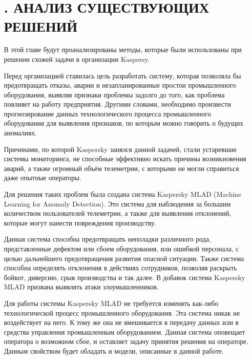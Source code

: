 \sectionbreak \section*{
  \cyrillicfont 
  \fontsize{14pt}{0pt}\selectfont
  \englishfont 
  . АНАЛИЗ СУЩЕСТВУЮЩИХ РЕШЕНИЙ
}

\titlespace

{\cyrillicfont 
\fontsize{13pt}{16.25pt}\selectfont 
\englishfont 

  \par \redline В этой главе будут проанализированы методы, которые были использованы при решении схожей задачи в организации Kaspersy. 

  \par \redline	Перед организацией ставилась цель разработать систему, которая позволяла бы предотвращать отказы, аварии и незапланированные простои промышленного оборудования, выявляя признаки проблемы задолго до того, как проблема повлияет на работу предприятия. Другими словами, необходимо произвести прогнозирование данных технологического процесса промышленного оборудования для выявления признаков, по которым можно говорить о будущих аномалиях. 

  \par \redline	Причинами, по которой Kaspersky занялся данной задачей, стали устаревшие системы мониторинга, не способные эффективно искать причины возникновения аварий, а также огромный объём телеметрии, с которыми не могли справиться даже опытные операторы. 

  \par \redline	Для решения таких проблем была создана система Kaspersky MLAD (Machine Learning for Anomaly Detection). Это система для наблюдения за большим количеством пользователей телеметрии, а также для выявления отклонений, которые могут нанести повреждения производству.   

  \par \redline Данная система способна предотвращать неполадки различного рода, представленные дефектом или сбоем оборудования, или ошибкой персонала, с целью дальнейшего предотвращения развития опасной ситуации. Также система способна определять отклонения в действиях сотрудников, позволяя раскрыть бойкот, диверсию, срыв производства и так далее. В добавок система Kaspersky MLAD призвана выявлять атаки злоумышленников. 

  \par \redline Для работы системы Kaspersky MLAD не требуется изменять как-либо технологической процесс промышленного оборудования. Эта система никак не воздействует на него. К тому же она не вмешивается в передачу данных или в средства управления промышленным оборудованием. Данная система оповещает оператора о возможном сбое, и оставляет задачу принятия решения на операторе. Данным свойством будет обладать и модели, описанные в данной работе. 

}
